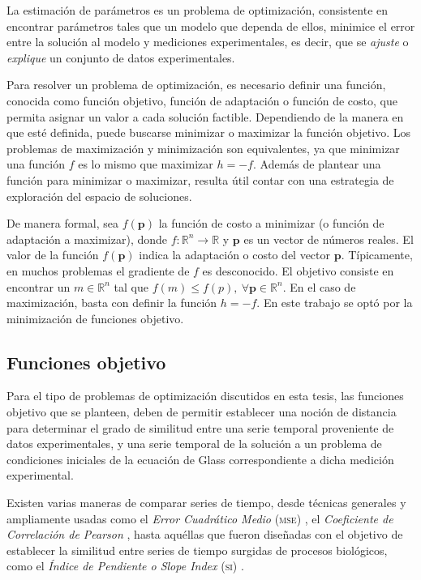 La estimación de parámetros es un problema de optimización, consistente en encontrar parámetros tales que un modelo que dependa de ellos, minimice el error entre la solución al modelo y mediciones experimentales, es decir, que se \emph{ajuste} o \emph{explique} un conjunto de datos experimentales.

Para resolver un problema de optimización, es necesario definir una función, conocida como función objetivo, función de adaptación o función de costo, que permita asignar un valor a cada solución factible. Dependiendo de la manera en que esté definida, puede buscarse minimizar o maximizar la función objetivo. Los problemas de maximización y minimización son equivalentes, ya que minimizar una función $f$ es lo mismo que maximizar $h=-f$. Además de plantear una función para minimizar o maximizar, resulta útil contar con una estrategia de exploración del espacio de soluciones. 

De manera formal, sea $f(\mathbf{p})$ la función de costo a minimizar (o función de adaptación a maximizar), donde $f:\mathbb{R}^n\rightarrow \mathbb{R}$ y $\mathbf{p}$ es un vector de números reales. El valor de la función $f(\mathbf{p})$ indica la adaptación o costo del vector $\mathbf{p}$. Típicamente, en muchos problemas el gradiente de $f$ es desconocido. El objetivo consiste en encontrar un $m \in \mathbb{R}^n$ tal que $f(m) \le f(p),\ \forall \mathbf{p} \in \mathbb{R}^n$. En el caso de maximización, basta con definir la función $h=-f$. En este trabajo se optó por la minimización de funciones objetivo.

\subsection{Funciones objetivo}

Para el tipo de problemas de optimización discutidos en esta tesis, las funciones objetivo que se planteen, deben de permitir establecer una noción de distancia para determinar el grado de similitud entre una serie temporal proveniente de datos experimentales, y una serie temporal de la solución a un problema de condiciones iniciales de la ecuación de Glass correspondiente a dicha medición experimental.

Existen varias maneras de comparar series de tiempo, desde técnicas generales y ampliamente usadas como el \emph{Error Cuadrático Medio} \textsc{(mse)} \citep{msewiki}, el \emph{Coeficiente de Correlación de Pearson} \citep{pearsoncorrwiki}, hasta aquéllas que fueron diseñadas con el objetivo de establecer la similitud entre series de tiempo surgidas de procesos biológicos, como el \emph{Índice de Pendiente o Slope Index} \textsc{(si)} \citeauthor{Cho2006} \citep{Cho2006}.%

